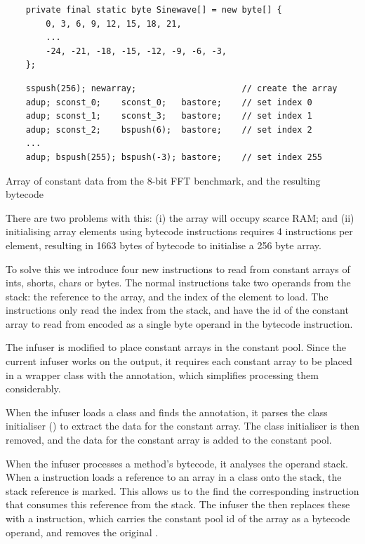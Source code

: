 \begin{listing}
\begin{verbatim}
    private final static byte Sinewave[] = new byte[] {
        0, 3, 6, 9, 12, 15, 18, 21,
        ...
        -24, -21, -18, -15, -12, -9, -6, -3, 
    };
\end{verbatim}
\begin{verbatim}
    sspush(256); newarray;                     // create the array
    adup; sconst_0;    sconst_0;   bastore;    // set index 0
    adup; sconst_1;    sconst_3;   bastore;    // set index 1
    adup; sconst_2;    bspush(6);  bastore;    // set index 2
    ...
    adup; bspush(255); bspush(-3); bastore;    // set index 255
\end{verbatim}
\caption{Array of constant data from the 8-bit FFT benchmark, and the resulting bytecode}
\label{lst-constant-array-initialisation}
\end{listing}


There are two problems with this: (i) the array will occupy scarce RAM; and (ii) initialising array elements using bytecode instructions requires 4 instructions per element, resulting in 1663 bytes of bytecode to initialise a 256 byte array.

To solve this we introduce four new  instructions to read from constant arrays of ints, shorts, chars or bytes. The normal  instructions take two operands from the stack: the reference to the array, and the index of the element to load. The  instructions only read the index from the stack, and have the id of the constant array to read from encoded as a single byte operand in the bytecode instruction.

The infuser is modified to place constant arrays in the constant pool. Since the current infuser works on the  output, it requires each constant array to be placed in a wrapper class with the  annotation, which simplifies processing them considerably.

When the infuser loads a class and finds the  annotation, it parses the class initialiser () to extract the data for the constant array. The class initialiser is then removed, and the data for the constant array is added to the constant pool.

When the infuser processes a method's bytecode, it analyses the operand stack. When a  instruction loads a reference to an array in a  class onto the stack, the stack reference is marked. This allows us to the find the corresponding  instruction that consumes this reference from the stack. The infuser the then replaces these with a  instruction, which carries the constant pool id of the array as a bytecode operand, and removes the original .


